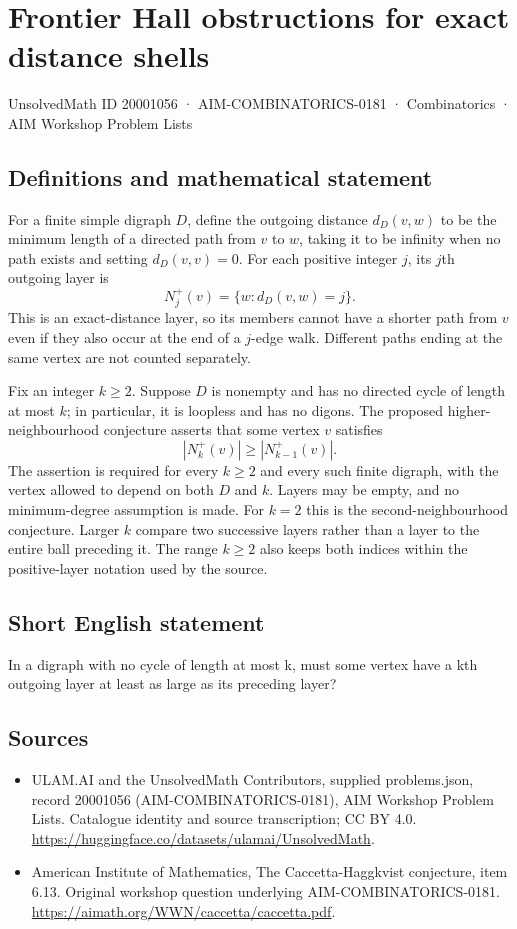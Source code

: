 \documentclass[11pt,a4paper]{article}
\begin{document}
\section*{Frontier Hall obstructions for exact distance shells}\label{20001056}
{\small UnsolvedMath ID 20001056 · AIM-COMBINATORICS-0181 · Combinatorics · AIM Workshop Problem Lists}
\subsection{Definitions and mathematical statement}
For a finite simple digraph $D$, define the outgoing distance
$d_D(v,w)$ to be the minimum length of a directed path from $v$ to
$w$, taking it to be infinity when no path exists and setting
$d_D(v,v)=0$. For each positive integer $j$, its $j$th outgoing
layer is
\[
                       N_j^+(v)=\{w:d_D(v,w)=j\}.
\]
This is an exact-distance layer, so its members cannot have a shorter
path from $v$ even if they also occur at the end of a $j$-edge walk.
Different paths ending at the same vertex are not counted separately.

Fix an integer $k\ge2$. Suppose $D$ is nonempty and has no directed
cycle of length at most $k$; in particular, it is loopless and has
no digons. The proposed higher-neighbourhood conjecture asserts that
some vertex $v$ satisfies
\[
                          |N_k^+(v)|\ge|N_{k-1}^+(v)|.
\]
The assertion is required for every $k\ge2$ and every such finite
digraph, with the vertex allowed to depend on both $D$ and $k$.
Layers may be empty, and no minimum-degree assumption is made.
For $k=2$ this is the second-neighbourhood conjecture. Larger $k$
compare two successive layers rather than a layer to the entire
ball preceding it. The range $k\ge2$ also keeps both indices within
the positive-layer notation used by the source.
\subsection{Short English statement}
In a digraph with no cycle of length at most k, must some vertex have a kth outgoing layer at least as large as its preceding layer?
\subsection{Sources}
\begin{itemize}
\item[S1] ULAM.AI and the UnsolvedMath Contributors, supplied problems.json, record 20001056 (AIM-COMBINATORICS-0181), AIM Workshop Problem Lists. Catalogue identity and source transcription; CC BY 4.0.
\url{https://huggingface.co/datasets/ulamai/UnsolvedMath}.
\item[S2] American Institute of Mathematics, The Caccetta-Haggkvist conjecture, item 6.13. Original workshop question underlying AIM-COMBINATORICS-0181.
\url{https://aimath.org/WWN/caccetta/caccetta.pdf}.
\end{itemize}
\end{document}
